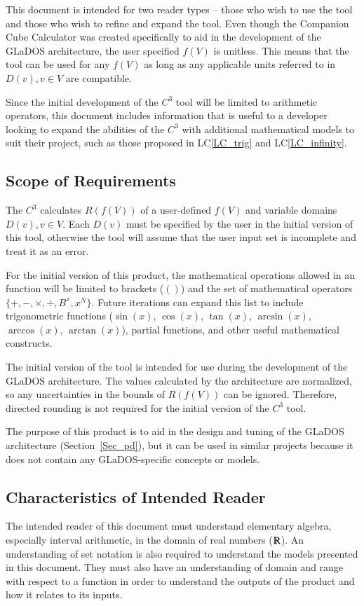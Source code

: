 \documentclass[12pt]{article}
\newcommand{\lcref}[1]{LC\ref{#1}}
\newcommand{\progname}{Companion Cube Calculator} %
\newcommand{\prognameAbbrv}{$C^{3}$}
\begin{document}
This document is intended for two reader types -- those who wish to use the 
tool and those who wish to refine and expand the tool. Even though the 
\progname{} was created specifically to aid in the development of the GLaDOS 
architecture, the user specified $f(V)$ is unitless. This means that the tool 
can be used for any $f(V)$ as long as any applicable units referred to in 
$D(v), v \in V$ are compatible.

Since the initial development of the \prognameAbbrv{} tool will be limited to 
arithmetic operators, this document includes information that is useful to a 
developer looking to expand the abilities of the \prognameAbbrv{} with 
additional mathematical models to suit their project, such as those proposed in 
\lcref{LC_trig} and \lcref{LC_infinity}. 

\subsection{Scope of Requirements} 
The \prognameAbbrv{} calculates $R(f(V))$ of a user-defined $f(V)$ and variable 
domains $D(v), v \in V$. Each $D(v)$ must be specified by the user in the 
initial version of this tool, otherwise the tool will assume that the user 
input set is incomplete and treat it as an error.

For the initial version of this product, the mathematical operations allowed in 
an function will be limited to brackets ($()$) and the set of mathematical 
operators $\{+, -, \times, \div, B^x, x^N\}$. Future iterations can expand this 
list to include trigonometric functions ($\sin(x)$, $\cos(x)$, $\tan(x)$, 
$\arcsin(x)$, $\arccos(x)$, $\arctan(x)$), partial functions, and other useful 
mathematical constructs.

The initial version of the tool is intended for use during the development of 
the GLaDOS architecture. The values calculated by the architecture are 
normalized, so any uncertainties in the bounds of $R(f(V))$ can be ignored. 
Therefore, directed rounding is not required for the initial version of the 
\prognameAbbrv{} tool.

The purpose of this product is to aid in the design and tuning of the GLaDOS 
architecture (Section~\ref{Sec_pd}), but it can be used in similar projects 
because it does not contain any GLaDOS-specific concepts or models.

\subsection{Characteristics of Intended Reader}
\label{intro_reader}
The intended reader of this document must understand elementary algebra, 
especially interval arithmetic, in the domain of real numbers 
($\varmathbb{R}$). An understanding of set notation is also required to 
understand the models presented in this document. They must also have an 
understanding of domain and range with respect to a function in order to 
understand the outputs of the product 
and how it relates to its inputs.
\end{document}
